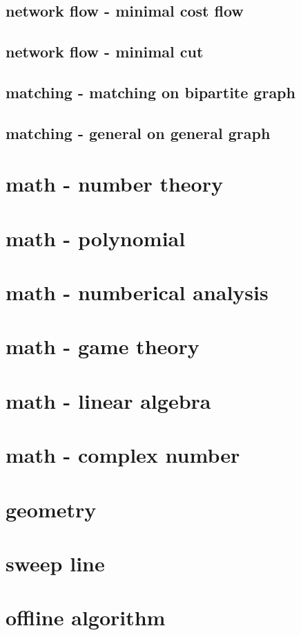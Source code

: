 \documentclass[UTF8, a4paper, titlepage, twoside]{ctexart}
\begin{document}
\subsection{network flow - minimal cost flow}



\subsection{network flow - minimal cut}

\subsection{matching - matching on bipartite graph}




\subsection{matching - general on general graph}


\section{math - number theory}


\section{math - polynomial}

\section{math - numberical analysis}

\section{math - game theory}


\section{math - linear algebra}




\section{math - complex number}


\section{geometry}

\section{sweep line}

\section{offline algorithm}
\end{document}
